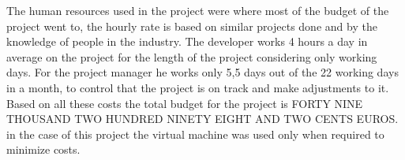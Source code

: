The human resources used in the project were where most of the budget of the project went to, the hourly rate is based on similar projects done and by the knowledge of people in the industry. The developer works 4 hours a day in average on the project for the length of the project considering only working days. For the project manager he works only 5,5 days out of the 22 working days in a month, to control that the project is on track and make adjustments to it.\\

Based on all these costs the total budget for the project is FORTY NINE THOUSAND TWO HUNDRED NINETY EIGHT AND TWO CENTS EUROS.
 in the case of this project the virtual machine was used only when required to minimize costs.